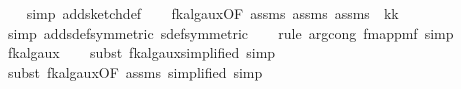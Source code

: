 \begin{isabellebody}
\ \ %
\endisadelimproof
%
\isatagproof
{}\isamarkupfalse%
\ {\isacharparenleft}{\kern0pt}simp\ add{\isacharcolon}{\kern0pt}sketch{\isacharunderscore}{\kern0pt}def{\isacharparenright}{\kern0pt}\isanewline
\ \ \isamarkupfalse%
\ fk{\isacharunderscore}{\kern0pt}alg{\isacharunderscore}{\kern0pt}aux{\isacharunderscore}{\kern0pt}{}{\isacharbrackleft}{\kern0pt}OF\ assms{\isacharparenleft}{\kern0pt}{}{\isacharparenright}{\kern0pt}\ assms{\isacharparenleft}{\kern0pt}{}{\isacharparenright}{\kern0pt}\ assms{\isacharparenleft}{\kern0pt}{}{\isacharparenright}{\kern0pt}{\isacharcomma}{\kern0pt}\ \ k{\isacharequal}{\kern0pt}{\isachardoublequoteopen}k{\isachardoublequoteclose}\ \ {\isasymepsilon}{\isacharequal}{\kern0pt}{\isachardoublequoteopen}{\isasymepsilon}{\isachardoublequoteclose}{\isacharbrackright}{\kern0pt}\isanewline
\ \ \isamarkupfalse%
\ {\isacharparenleft}{\kern0pt}simp\ add{\isacharcolon}{\kern0pt}sdef{\isacharbrackleft}{\kern0pt}symmetric{\isacharbrackright}{\kern0pt}\ sdef{\isacharbrackleft}{\kern0pt}symmetric{\isacharbrackright}{\kern0pt}{\isacharparenright}{\kern0pt}\isanewline
\ \ \isamarkupfalse%
\ {\isacharparenleft}{\kern0pt}rule\ arg{\isacharunderscore}{\kern0pt}cong{}{\isacharbrackleft}{\kern0pt}\ f{\isacharequal}{\kern0pt}{\isachardoublequoteopen}map{\isacharunderscore}{\kern0pt}pmf{\isachardoublequoteclose}{\isacharbrackright}{\kern0pt}{\isacharcomma}{\kern0pt}\ simp{\isacharparenright}{\kern0pt}\isanewline
\ \ \isamarkupfalse%
\ fk{\isacharunderscore}{\kern0pt}alg{\isacharunderscore}{\kern0pt}aux{\isacharunderscore}{\kern0pt}{}\isanewline
\ \ \isamarkupfalse%
\ {\isacharparenleft}{\kern0pt}subst\ fk{\isacharunderscore}{\kern0pt}alg{\isacharunderscore}{\kern0pt}aux{\isacharunderscore}{\kern0pt}{}{\isacharbrackleft}{\kern0pt}simplified{\isacharbrackright}{\kern0pt}{\isacharcomma}{\kern0pt}\ simp{\isacharparenright}{\kern0pt}\isanewline
\ \ \isamarkupfalse%
\ {\isacharparenleft}{\kern0pt}subst\ fk{\isacharunderscore}{\kern0pt}alg{\isacharunderscore}{\kern0pt}aux{\isacharunderscore}{\kern0pt}{}{\isacharbrackleft}{\kern0pt}OF\ assms{\isacharparenleft}{\kern0pt}{}{\isacharparenright}{\kern0pt}{\isacharcomma}{\kern0pt}\ simplified{\isacharbrackright}{\kern0pt}{\isacharcomma}{\kern0pt}\ simp{\isacharparenright}{\kern0pt}\isanewline

\end{isabellebody}
